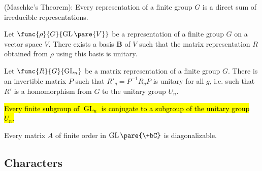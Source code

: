 \documentclass[hidelinks]{article}
\DeclareMathOperator{\GL}{GL}
\begin{document}
\begin{corollary}
    \mbox{}
    \begin{cenum}
        \item (Maschke's Theorem): Every representation of a finite group $G$ is a direct sum of irreducible representations.
        \item Let $\func{\rho}{G}{\GL\pare{V}}$ be a representation of a finite group $G$ on a vector space $V$. There exists a basis $\mathbf{B}$ of $V$ such that the matrix representation $R$ obtained from $\rho$ using this basis is unitary.
        \item Let $\func{R}{G}{\GL_n}$ be a matrix representation of a finite group $G$. There is an invertible matrix $P$ such that $R'_g = P^{-1}R_gP$ is unitary for all $g$, i.e. such that $R'$ is a homomorphism from $G$ to the unitary group $U_n$.
        \item \hl{Every finite subgroup of $\GL_n$ is conjugate to a subgroup of the unitary group $U_n$.}
    \end{cenum}
\end{corollary}
\begin{corollary}
    Every matrix $A$ of finite order in $\GL\pare{\+bC}$ is diagonalizable.
\end{corollary}


\subsection{Characters} %
\label{sub:characters}
\end{document}
